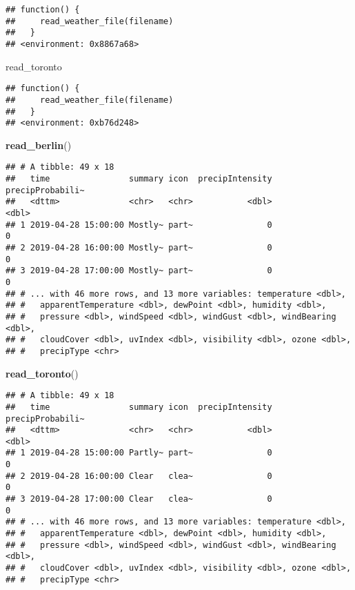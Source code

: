 \documentclass[]{book}
\newenvironment{Shaded}{\begin{snugshade}}{\end{snugshade}}
\newcommand{\KeywordTok}[1]{\textcolor[rgb]{0.13,0.29,0.53}{\textbf{#1}}}
\newcommand{\NormalTok}[1]{#1}
\begin{document}
\begin{verbatim}
## function() {
##     read_weather_file(filename)
##   }
## <environment: 0x8867a68>
\end{verbatim}

\begin{Shaded}
\begin{Highlighting}[]
\NormalTok{read_toronto}
\end{Highlighting}
\end{Shaded}

\begin{verbatim}
## function() {
##     read_weather_file(filename)
##   }
## <environment: 0xb76d248>
\end{verbatim}

\begin{Shaded}
\begin{Highlighting}[]
\KeywordTok{read_berlin}\NormalTok{()}
\end{Highlighting}
\end{Shaded}

\begin{verbatim}
## # A tibble: 49 x 18
##   time                summary icon  precipIntensity precipProbabili~
##   <dttm>              <chr>   <chr>           <dbl>            <dbl>
## 1 2019-04-28 15:00:00 Mostly~ part~               0                0
## 2 2019-04-28 16:00:00 Mostly~ part~               0                0
## 3 2019-04-28 17:00:00 Mostly~ part~               0                0
## # ... with 46 more rows, and 13 more variables: temperature <dbl>,
## #   apparentTemperature <dbl>, dewPoint <dbl>, humidity <dbl>,
## #   pressure <dbl>, windSpeed <dbl>, windGust <dbl>, windBearing <dbl>,
## #   cloudCover <dbl>, uvIndex <dbl>, visibility <dbl>, ozone <dbl>,
## #   precipType <chr>
\end{verbatim}

\begin{Shaded}
\begin{Highlighting}[]
\KeywordTok{read_toronto}\NormalTok{()}
\end{Highlighting}
\end{Shaded}

\begin{verbatim}
## # A tibble: 49 x 18
##   time                summary icon  precipIntensity precipProbabili~
##   <dttm>              <chr>   <chr>           <dbl>            <dbl>
## 1 2019-04-28 15:00:00 Partly~ part~               0                0
## 2 2019-04-28 16:00:00 Clear   clea~               0                0
## 3 2019-04-28 17:00:00 Clear   clea~               0                0
## # ... with 46 more rows, and 13 more variables: temperature <dbl>,
## #   apparentTemperature <dbl>, dewPoint <dbl>, humidity <dbl>,
## #   pressure <dbl>, windSpeed <dbl>, windGust <dbl>, windBearing <dbl>,
## #   cloudCover <dbl>, uvIndex <dbl>, visibility <dbl>, ozone <dbl>,
## #   precipType <chr>
\end{verbatim}
\end{document}
